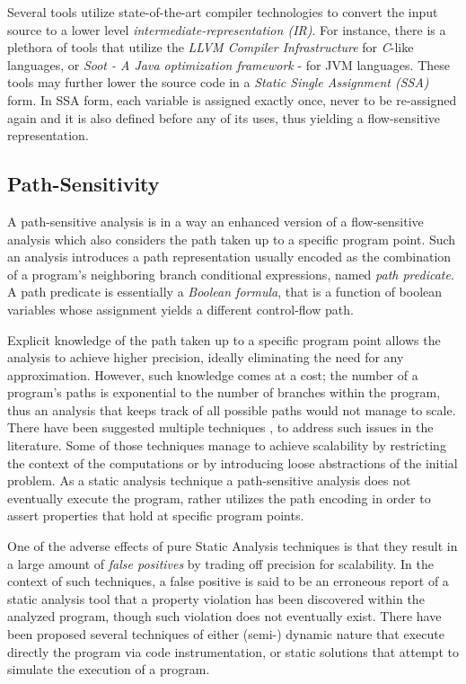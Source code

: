 Several tools utilize state-of-the-art compiler technologies to
convert the input source to a lower level \emph{intermediate-representation (IR)}.
For instance, there is a plethora of tools that utilize the \emph{LLVM Compiler 
Infrastructure}\cite{llvm-lattner} for \emph{C}-like languages,
or \emph{Soot - A Java optimization framework}\cite{soot} - for JVM languages.
These tools may further lower the source code in a
\emph{Static Single Assignment (SSA)} form. In SSA form, each variable is
assigned exactly once, never to be re-assigned again and it is also defined
before any of its uses, thus yielding a flow-sensitive representation.

\subsection{Path-Sensitivity}

A path-sensitive analysis is in a way an enhanced version of a
flow-sensitive analysis which also considers the path taken up to
a specific program point. Such an analysis
introduces a path representation usually encoded as the combination of
a program's neighboring branch conditional expressions,
named \textit{path predicate}. A path predicate is essentially a
\textit{Boolean formula}, that is a function of boolean variables whose assignment yields a
different control-flow path.

Explicit knowledge of the path taken up to a specific
program point allows the analysis to achieve higher
precision, ideally eliminating the need for any approximation.
However, such knowledge comes at a cost; the number of a program's
paths is exponential to the number of branches within the program,
thus an analysis that keeps track of all possible paths would not
manage to scale. There have been suggested multiple techniques
\cite{dillig2008sound}, \cite{das2002esp} to address such issues
in the literature. Some of those techniques manage to achieve
scalability by restricting the context of the computations or
by introducing loose abstractions of the initial problem.
As a static analysis technique a path-sensitive analysis does not
eventually execute the program, rather utilizes
the path encoding in order to assert properties that hold at
specific program points.

One of the adverse effects of pure Static Analysis techniques
is that they result in a large amount of \textit{false positives} by
trading off precision for scalability. In the context of
such techniques, a false positive is said to be an erroneous report
of a static analysis tool that a property violation has been
discovered within the analyzed program, though such violation
does not eventually exist. There have been
proposed several techniques of either (semi-) dynamic nature
that execute directly the program via code instrumentation, or
static solutions that attempt to simulate the execution of a program.

